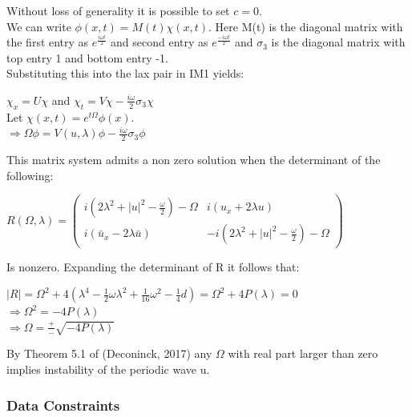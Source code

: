 \documentclass[12pt]{article}
\begin{document}
Without loss of generality it is possible to set $c=0$. \\  

We can write $\phi(x,t) = M(t) \chi (x,t) $. Here M(t) is the diagonal matrix 
with the first entry as $e^{\frac{i \omega t}{2}}$ and second entry as 
$e^{\frac{-i \omega t}{2}}$ and $\sigma_{3}$ is the diagonal matrix with top 
entry 1 and bottom entry -1.\\  

Substituting this into the lax pair in IM1 yields: \\ 
\begin{center} 
$\chi _{x} = U \chi $ and $\chi_{t} = V \chi - \frac{i \omega}{2} \sigma_{3} 
\chi$ \\ 
Let $\chi (x,t) = e^{t \Omega} \phi (x) $. \\ 
$\Rightarrow \Omega \phi = V(u,\lambda) \phi - \frac{i \omega}{2} \sigma_{3} 
\phi$ \\ 
\end{center} 
This matrix system admits a non zero solution when the determinant of the 
following:
\begin{center}  
$ R(\Omega, \lambda) = \begin{pmatrix} 
i(2\lambda^{2} + |u|^{2} - \frac{\omega}{2}) - \Omega & i(u_{x}+2\lambda u) \\
i(\bar{u}_{x}-2\lambda \bar{u}) & -i(2\lambda^{2} + |u|^{2} - \frac{\omega}{2}) 
- \Omega
\end{pmatrix} $ \\  
\end{center} 
Is nonzero. Expanding the determinant of R it follows that: \\ 
\begin{center}
$|R| = \Omega^{2} + 4(\lambda^{4} - \frac{1}{2} \omega \lambda^{2} + 
\frac{1}{16} \omega^{2} - \frac{1}{4}d ) = \Omega^{2} +4P(\lambda) = 0$ \\ 
$ \Rightarrow \Omega^{2} = -4P(\lambda)$ \\ 
$ \Rightarrow \Omega = \frac{+}{-}\sqrt{-4P(\lambda)} $\\ 
\end{center} 
By Theorem 5.1 of (Deconinck, 2017) any $\Omega$ with real part larger than 
zero implies instability of the periodic wave u. 
 

\subsubsection{Data Constraints} \label{sec_DataConstraints}    
\end{document}
